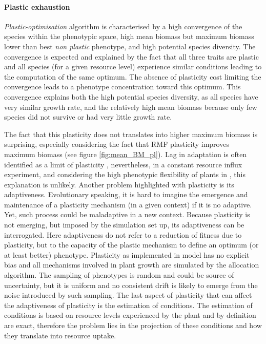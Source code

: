 

\paragraph{Plastic exhaustion}

\textit{Plastic-optimisation} algorithm is characterised by a high convergence of the species within the phenotypic space, high mean biomass but maximum biomass lower than best \textit{non plastic} phenotype, and high potential species diversity. The convergence is expected and explained by the fact that all three traits are plastic and all species (for a given resource level) experience similar conditions leading to the computation of the same optimum. The absence of plasticity cost limiting the convergence leads to a phenotype concentration toward this optimum. This convergence explains both the high potential species diversity, as all species have very similar growth rate, and the relatively high mean biomass because only few species did not survive or had very little growth rate.

The fact that this plasticity does not translates into higher maximum biomass is surprising, especially considering the fact that RMF plasticity improves maximum biomass (see figure \ref{fig:mean_BM_pl}). Lag in adaptation is often identified as a limit of plasticity \parencite{dewitt_costs_1998, van_kleunen_constraints_2005}, nevertheless, in a constant resource influx experiment, and considering the high phenotypic flexibility of plants in \model, this explanation is unlikely. Another problem highlighted with plasticity is its adaptiveness. Evolutionary speaking, it is hard to imagine the emergence and maintenance of a plasticity mechanism (in a given context) if it is no adaptive. Yet, such process could be maladaptive in a new context. Because plasticity is not emerging, but imposed by the simulation set up, its adaptiveness can be interrogated. Here adaptiveness do not refer to a reduction of fitness due to plasticity, but to the capacity of the plastic mechanism to define an optimum (or at least better) phenotype. Plasticity as implemented in model has no explicit bias and all mechanisms involved in plant growth are simulated by the allocation algorithm. The sampling of phenotypes is random and could be source of uncertainty, but it is uniform and no consistent drift is likely to emerge from the noise introduced by such sampling. The last aspect of plasticity that can affect the adaptiveness of plasticity is the estimation of conditions. The estimation of conditions is based on resource levels experienced by the plant and by definition are exact, therefore the problem lies in the projection of these conditions and how they translate into resource uptake.


